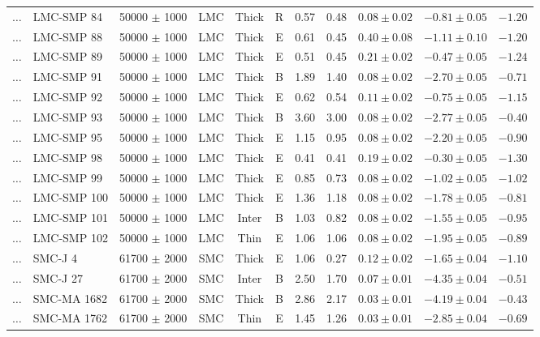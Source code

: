 \documentclass[useAMS]{mn2e}
\begin{document}
\begin{center}
{\begin{longtable}{llccccccccc}
$\ldots$	&	LMC-SMP 84	&	50000 $\pm$ 1000	&	LMC	&	Thick	&	R	&	0.57	&	0.48	&	$0.08 \pm  0.02$	&	$-0.81 \pm 0.05$	&	$-1.20$	\\
$\ldots$	&	LMC-SMP 88	&	50000 $\pm$ 1000	&	LMC	&	Thick	&	E	&	0.61	&	0.45	&	$0.40 \pm  0.08$	&	$-1.11 \pm 0.10$	&	$-1.20$	\\
$\ldots$	&	LMC-SMP 89	&	50000 $\pm$ 1000	&	LMC	&	Thick	&	E	&	0.51	&	0.45	&	$0.21 \pm  0.02$	&	$-0.47 \pm 0.05$	&	$-1.24$	\\
$\ldots$	&	LMC-SMP 91	&	50000 $\pm$ 1000	&	LMC	&	Thick	&	B	&	1.89	&	1.40	&	$0.08 \pm  0.02$	&	$-2.70 \pm 0.05$	&	$-0.71$	\\
$\ldots$	&	LMC-SMP 92	&	50000 $\pm$ 1000	&	LMC	&	Thick	&	E	&	0.62	&	0.54	&	$0.11 \pm  0.02$	&	$-0.75 \pm 0.05$	&	$-1.15$	\\
$\ldots$	&	LMC-SMP 93	&	50000 $\pm$ 1000	&	LMC	&	Thick	&	B	&	3.60	&	3.00	&	$0.08 \pm  0.02$	&	$-2.77 \pm 0.05$	&	$-0.40$	\\
$\ldots$	&	LMC-SMP 95	&	50000 $\pm$ 1000	&	LMC	&	Thick	&	E	&	1.15	&	0.95	&	$0.08 \pm  0.02$	&	$-2.20 \pm 0.05$	&	$-0.90$	\\
$\ldots$	&	LMC-SMP 98	&	50000 $\pm$ 1000	&	LMC	&	Thick	&	E	&	0.41	&	0.41	&	$0.19 \pm  0.02$	&	$-0.30 \pm 0.05$	&	$-1.30$	\\
$\ldots$	&	LMC-SMP 99	&	50000 $\pm$ 1000	&	LMC	&	Thick	&	E	&	0.85	&	0.73	&	$0.08 \pm  0.02$	&	$-1.02 \pm 0.05$	&	$-1.02$	\\
$\ldots$	&	LMC-SMP 100	&	50000 $\pm$ 1000	&	LMC	&	Thick	&	E	&	1.36	&	1.18	&	$0.08 \pm  0.02$	&	$-1.78 \pm 0.05$	&	$-0.81$	\\
$\ldots$	&	LMC-SMP 101	&	50000 $\pm$ 1000	&	LMC	&	Inter	&	B	&	1.03	&	0.82	&	$0.08 \pm  0.02$	&	$-1.55 \pm 0.05$	&	$-0.95$	\\
$\ldots$	&	LMC-SMP 102	&	50000 $\pm$ 1000	&	LMC	&	Thin	&	E	&	1.06	&	1.06	&	$0.08 \pm  0.02$	&	$-1.95 \pm 0.05$	&	$-0.89$	\\
\hline																						
$\ldots$	&	SMC-J 4	&	61700 $\pm$ 2000	&	SMC	&	Thick	&	E	&	1.06	&	0.27	&	$0.12 \pm  0.02$	&	$-1.65 \pm 0.04$	&	$-1.10$	\\
$\ldots$	&	SMC-J 27	&	61700 $\pm$ 2000	&	SMC	&	Inter	&	B	&	2.50	&	1.70	&	$0.07 \pm  0.01$	&	$-4.35 \pm 0.04$	&	$-0.51$	\\
$\ldots$	&	SMC-MA 1682	&	61700 $\pm$ 2000	&	SMC	&	Thick	&	B	&	2.86	&	2.17	&	$0.03 \pm  0.01$	&	$-4.19 \pm 0.04$	&	$-0.43$	\\
$\ldots$	&	SMC-MA 1762	&	61700 $\pm$ 2000	&	SMC	&	Thin	&	E	&	1.45	&	1.26	&	$0.03 \pm  0.01$	&	$-2.85 \pm 0.04$	&	$-0.69$	\\

\end{longtable}}
\end{center}
\end{document}
